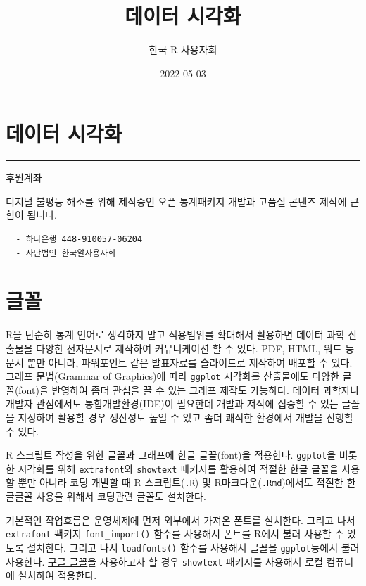 \documentclass[
]{book}
\title{데이터 시각화}
\author{한국 R 사용자회}
\date{2022-05-03}
\begin{document}
\maketitle

{
\setcounter{tocdepth}{1}
\tableofcontents
}
\hypertarget{uxb370uxc774uxd130-uxc2dcuxac01uxd654}{%
\chapter*{데이터 시각화}\label{uxb370uxc774uxd130-uxc2dcuxac01uxd654}}

\begin{center}\rule{0.5\linewidth}{0.5pt}\end{center}

후원계좌

디지털 불평등 해소를 위해 제작중인 오픈 통계패키지 개발과 고품질 콘텐츠 제작에 큰 힘이 됩니다.

\begin{verbatim}
  - 하나은행 448-910057-06204
  - 사단법인 한국알사용자회
\end{verbatim}

\hypertarget{viz-font}{%
\chapter{글꼴}\label{viz-font}}

R을 단순히 통계 언어로 생각하지 말고 적용범위를 확대해서 활용하면
데이터 과학 산출물을 다양한 전자문서로 제작하여 커뮤니케이션 할 수 있다.
PDF, HTML, 워드 등 문서 뿐만 아니라, 파워포인트 같은 발표자료를
슬라이드로 제작하여 배포할 수 있다. 그래프 문법(Grammar of Graphics)에 따라
\texttt{ggplot} 시각화를 산출물에도 다양한 글꼴(font)을 반영하여 좀더 관심을 끌 수 있는
그래프 제작도 가능하다. 데이터 과학자나 개발자 관점에서도 통합개발환경(IDE)이
필요한데 개발과 저작에 집중할 수 있는 글꼴을 지정하여 활용할 경우
생산성도 높일 수 있고 좀더 쾌적한 환경에서 개발을 진행할 수 있다.

R 스크립트 작성을 위한 글꼴과 그래프에 한글 글꼴(font)을 적용한다.
\texttt{ggplot}을 비롯한 시각화를 위해 \texttt{extrafont}와 \texttt{showtext} 패키지를
활용하여 적절한 한글 글꼴을 사용할 뿐만 아니라 코딩 개발할 때
R 스크립트(\texttt{.R}) 및 R마크다운(\texttt{.Rmd})에서도 적절한 한글글꼴 사용을 위해서
코딩관련 글꼴도 설치한다.

기본적인 작업흐름은 운영체제에 먼저 외부에서 가져온 폰트를 설치한다.
그리고 나서 \texttt{extrafont} 팩키지 \texttt{font\_import()} 함수를 사용해서 폰트를
R에서 불러 사용할 수 있도록 설치한다. 그리고 나서 \texttt{loadfonts()} 함수를
사용해서 글꼴을 \texttt{ggplot}등에서 불러 사용한다.
\href{https://fonts.google.com/}{구글 글꼴}을 사용하고자 할 경우 \texttt{showtext} 패키지를
사용해서 로컬 컴퓨터에 설치하여 적용한다.
\end{document}
